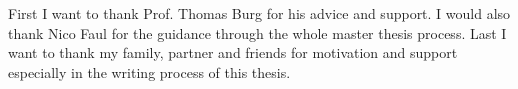 First I want to thank Prof. Thomas Burg for his advice and support. I would also thank Nico Faul for the guidance through the whole master thesis process. Last I want to thank my family, partner and friends for motivation and support especially in the writing process of this thesis.